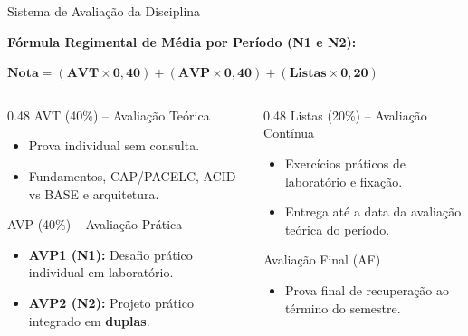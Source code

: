 \begin{frame}{Sistema de Avaliação da Disciplina}
  \vspace{-0.2cm}
  \begin{center}
    {\normalsize \textbf{Fórmula Regimental de Média por Período (N1 e N2):}}\par
    \vspace{0.15cm}
    {\large \alert{$\mathbf{\text{Nota} = (\text{AVT} \times 0{,}40) + (\text{AVP} \times 0{,}40) + (\text{Listas} \times 0{,}20)}$}}
  \end{center}

  \vspace{0.2cm}

  \begin{columns}[t]
    \begin{column}{0.48\textwidth}
      \footnotesize
      \alert{AVT (40\%) -- Avaliação Teórica}
      \begin{itemize}
        \item Prova individual sem consulta.
        \item Fundamentos, CAP/PACELC, ACID vs BASE e arquitetura.
      \end{itemize}
      \vspace{0.2cm}
      \alert{AVP (40\%) -- Avaliação Prática}
      \begin{itemize}
        \item \textbf{AVP1 (N1):} Desafio prático individual em laboratório.
        \item \textbf{AVP2 (N2):} Projeto prático integrado em \textbf{duplas}.
      \end{itemize}
    \end{column}

    \begin{column}{0.48\textwidth}
      \footnotesize
      \alert{Listas (20\%) -- Avaliação Contínua}
      \begin{itemize}
        \item Exercícios práticos de laboratório e fixação.
        \item Entrega até a data da avaliação teórica do período.
      \end{itemize}
      \vspace{0.2cm}
      \alert{Avaliação Final (AF)}
      \begin{itemize}
        \item Prova final de recuperação ao término do semestre.
      \end{itemize}
    \end{column}
  \end{columns}
\end{frame}

